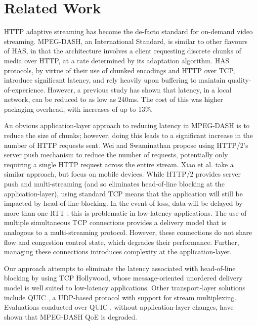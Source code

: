 \section{Related Work}
\label{sec:related}

HTTP adaptive streaming has become the de-facto standard for on-demand video streaming.
MPEG-DASH, an International Standard, is similar to other flavours of HAS, in that the
architecture involves a client requesting discrete chunks of media over HTTP, at a rate
determined by its adaptation algorithm. HAS protocols, by virtue of their use of chunked
encodings and HTTP over TCP, introduce significant latency, and rely heavily upon
buffering to maintain quality-of-experience. However, a previous study has shown that
latency, in a local network, can be reduced to as low as 240ms. The cost of this was
higher packaging overhead, with increases of up to 13\%.

An obvious application-layer approach to reducing latency in MPEG-DASH is to reduce the
size of chunks; however, doing this leads to a significant increase in the number of HTTP
requests sent. Wei and Swaminathan \cite{wei2014} propose using HTTP/2's server push
mechanism to reduce the number of requests, potentially only requiring a single HTTP
request across the entire stream. Xiao et al. \cite{xiao2016dash2m} take a similar
approach, but focus on mobile devices. While HTTP/2 provides server push and
multi-streaming (and so eliminates head-of-line blocking at the application-layer), using
standard TCP means that the application will still be impacted by head-of-line blocking.
In the event of loss, data will be delayed by more than one RTT \cite{mcquistin2016tcp2};
this is problematic in low-latency applications. The use of multiple simultaneous
TCP connections provides a delivery model that is analogous to a multi-streaming protocol.
However, these connections do not share flow and congestion control state, which degrades
their performance. Further, managing these connections introduces complexity at the
application-layer.

Our approach attempts to eliminate the latency associated with head-of-line blocking by
using TCP Hollywood, whose message-oriented unordered delivery model is well suited to
low-latency applications. Other transport-layer solutions include QUIC
\cite{draft-ietf-quic-transport-latest}, a UDP-based protocol with support for stream
multiplexing. Evaluations conducted over QUIC \cite{bhat:2017:not-so-quic}, without application-layer changes,
have shown that MPEG-DASH QoE is degraded. 

